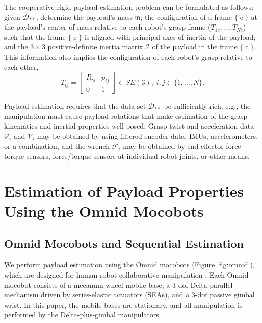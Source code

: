 \documentclass[letterpaper, 10 pt, journal, twoside]{IEEEtran}
\newcommand{\wrench}{{\mathcal F}}
\newcommand{\twist}{{\mathcal V}}
\newcommand{\mass}{{\mathfrak{m}}}
\newcommand{\framec}{\operatorname{c}}
\begin{document}
The cooperative rigid payload estimation problem can be formulated as follows: given $\mathcal{D}_{**}$, determine the payload's mass $\mass$; the configuration of a frame $\{\framec\}$ at the payload's center of mass relative to each robot's grasp frame ($T_{1c}, \ldots, T_{Nc}$) such that the frame $\{\framec\}$ is aligned with principal axes of inertia of the payload; and the $3 \times 3$ positive-definite inertia matrix $\mathcal{I}$ of the payload in the frame $\{\framec\}$. This information also implies the configuration of each robot's grasp relative to each other, 
\[
T_{ij} = \begin{bmatrix}
    R_{ij} &  p_{ij } \\
    0 & 1
\end{bmatrix} \in SE(3), \; i, j \in \{1, \ldots, N\}.
\]

Payload estimation requires that the data set $\mathcal{D}_{**}$ be sufficiently rich, e.g., the manipulation must cause payload rotations that make estimation of the grasp kinematics and inertial properties well posed. Grasp twist and acceleration data $\twist_i$ and $\dot{\twist}_i$ may be obtained by using filtered encoder data, IMUs, accelerometers, or a combination, and the wrench $\wrench_i$ may be obtained by end-effector force-torque sensors, force/torque sensors at individual robot joints, or other means.


\section{Estimation of Payload Properties Using the Omnid Mocobots}

\subsection{Omnid Mocobots and Sequential Estimation}

We perform payload estimation using the Omnid mocobots (Figure \ref{fig:omnid}), which are designed for human-robot collaborative manipulation \cite{elwin2022human}.  Each Omnid mocobot consists of a mecanum-wheel mobile base, a 3-dof Delta parallel mechanism driven by series-elastic actuators (SEAs), and a 3-dof passive gimbal wrist. In this paper, the mobile bases are stationary, and all manipulation is performed by the Delta-plus-gimbal manipulators.
\end{document}
